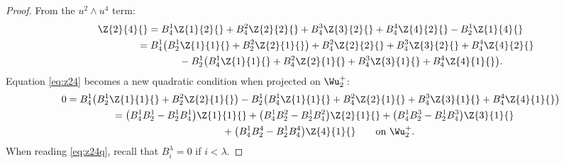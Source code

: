 \begin{proof}
From the $u^2 \wedge u^4$ term:
\begin{gather}
\Z{2}{4}{}
=
 B^{1}_{4}\Z{1}{2}{} + B^{2}_{4}\Z{2}{2}{} +
 B^{3}_{4}\Z{3}{2}{} + B^{4}_{4}\Z{4}{2}{} -
 B^{1}_{2}\Z{1}{4}{}\nonumber\\
\hphantom{\Z{2}{4}{}}{}
=
B^{1}_{4}\big( B^{1}_{2}\Z{1}{1}{} +
B^{2}_{2}\Z{2}{1}{}\big) + B^{2}_{4}\Z{2}{2}{} +
B^{3}_{4}\Z{3}{2}{} + B^{4}_{4}\Z{4}{2}{} \nonumber\\
\hphantom{\Z{2}{4}{}=}{}
- B^{1}_{2}\big(
B^{1}_{4}\Z{1}{1}{} + B^{2}_{4}\Z{2}{1}{} +
B^{3}_{4}\Z{3}{1}{} + B^{4}_{4}\Z{4}{1}{}\big).
\label{eq:z24}
\end{gather}
Equation \eqref{eq:z24} becomes a new quadratic condition when projected on
$\Wu^+_2$:
\begin{gather}
0
=  B^{1}_{4}\big( B^{1}_{2}\Z{1}{1}{} +
B^{2}_{2}\Z{2}{1}{}\big)
 - B^{1}_{2}\big( B^{1}_{4}\Z{1}{1}{} + B^{2}_{4}\Z{2}{1}{} +
B^{3}_{4}\Z{3}{1}{} + B^{4}_{4}\Z{4}{1}{}\big)\nonumber\\
\hphantom{0}{}
=
\big( B^{1}_{4}B^{1}_{2}-B^{1}_{2}B^{1}_{4}\big)\Z{1}{1}{}
 +
\big( B^{1}_{4}B^{2}_{2}-B^{1}_{2}B^{2}_{4}\big)\Z{2}{1}{}
  +
\big( B^{1}_{4}B^{3}_{2}-B^{1}_{2}B^{3}_{4}\big)\Z{3}{1}{}\nonumber\\
\hphantom{0=}{}
 +
\big( B^{1}_{4}B^{4}_{2}-B^{1}_{2}B^{4}_{4}\big)\Z{4}{1}{} \qquad \text{on
$\Wu^+_2$.}
\label{eq:z24q}
\end{gather}
When reading \eqref{eq:z24q}, recall that $B^\lambda_i =0$ if $i < \lambda$.


\end{proof}
